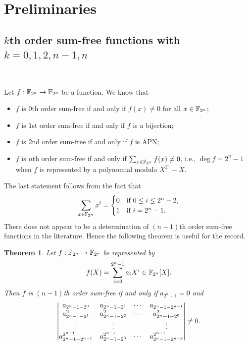 \documentclass{amsart}
\newtheorem{thm}{Theorem}[section]
\numberwithin{equation}{section}
\theoremstyle{definition}
\newcommand{\f}{\Bbb F}
\begin{document}

\section{Preliminaries}


\subsection{$k$th order sum-free functions with $k=0,1,2,n-1,n$}\

Let $f:\f_{2^n}\to\f_{2^n}$ be a function. We know that
\begin{itemize}
\item $f$ is $0$th order sum-free if and only if $f(x)\ne 0$ for all $x\in\f_{2^n}$;
\item $f$ is $1$st order sum-free if and only if $f$ is a bijection;
\item $f$ is $2$nd order sum-free if and only if $f$ is APN;
\item $f$ is $n$th order sum-free if and only if $\sum_{x\in\f_{2^n}}f(x)\ne 0$, i.e., $\deg f=2^n-1$ when $f$ is represented by a polynomial modulo $X^{2^n}-X$.
\end{itemize}
The last statement follows from the fact that
\[
\sum_{x\in\f_{2^n}}x^i=\begin{cases}
0&\text{if}\ 0\le i\le 2^n-2,\cr
1&\text{if}\ i=2^n-1.
\end{cases}
\]
There does not appear to be a determination of $(n-1)$th order sum-free functions in the literature. Hence the following theorem is useful for the record.

\begin{thm}\label{n-1order}
Let $f:\f_{2^n}\to \f_{2^n}$ be represented by
\[
f(X)=\sum_{i=0}^{2^n-1}a_iX^i\in\f_{2^n}[X].
\]
Then $f$ is $(n-1)$th order sum-free if and only if $a_{2^n-1}=0$ and
\begin{equation}\label{det-ne0}
\left|
\begin{matrix}
a_{2^n-1-2^0}&a_{2^n-1-2^1}&\cdots &a_{2^n-1-2^{n-1}}\cr
a_{2^n-1-2^1}^2&a_{2^n-1-2^2}^2&\cdots &a_{2^n-1-2^0}^2\cr
\vdots&\vdots&&\vdots\cr
a_{2^n-1-2^{n-1}}^{2^{n-1}}&a_{2^n-1-2^0}^{2^{n-1}}&\cdots &a_{2^n-1-2^{n-2}}^{2^{n-1}}
\end{matrix}
\right|\ne 0.
\end{equation}
\end{thm}
\end{document}
